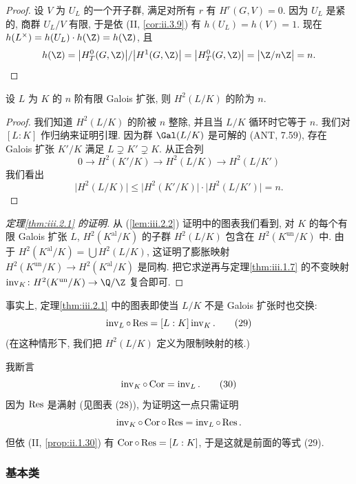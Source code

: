 \begin{proof}
设 $V$ 为 $U_L$ 的一个开子群, 满足对所有 $r$ 有 $H^r(G,V)=0$. 因为 $U_L$ 是紧的, 商群 $U_L/V$ 有限, 于是依 (II, \ref{cor:ii.3.9}) 有 $h(U_L)=h(V)=1$. 现在 $h(L^\times)=h(U_L)\cdot h(\Z)=h(\Z)$, 且
\[
 h(\Z)=\bigl|H_T^0(G,\Z)\bigr|/\bigl|H^1(G,\Z)\bigr|=\bigl|H_T^0(G,\Z)\bigr|=\bigl|\Z/n\Z\bigr|=n.
\]
\end{proof}

\begin{lemma}\label{lem:iii.2.6}
设 $L$ 为 $K$ 的 $n$ 阶有限 Galois 扩张, 则 $H^2(L/K)$ 的阶为 $n$.
\end{lemma}

\begin{proof}
我们知道 $H^2(L/K)$ 的阶被 $n$ 整除, 并且当 $L/K$ 循环时它等于 $n$. 我们对 $[L:K]$ 作归纳来证明引理. 因为群 $\Gal(L/K)$ 是可解的 (ANT, 7.59), 存在 Galois 扩张 $K'/K$ 满足 $L\supsetneq K'\supsetneq K$. 从正合列
\[
 0\to H^2(K'/K)\to H^2(L/K)\to H^2(L/K')
\]
我们看出
\[
 \bigl|H^2(L/K)\bigr|\le\bigl|H^2(K'/K)\bigr|\cdot\bigl|H^2(L/K')\bigr|=n.
\]
\end{proof}

\begin{proof}[定理\ref{thm:iii.2.1} 的证明]
从 (\ref{lem:iii.2.2}) 证明中的图表我们看到, 对 $K$ 的每个有限 Galois 扩张 $L$, $H^2(K^{\mathrm{al}}/K)$ 的子群 $H^2(L/K)$ 包含在 $H^2(K^{\mathrm{un}}/K)$ 中. 由于 $H^2(K^{\mathrm{al}}/K)=\bigcup H^2(L/K)$, 这证明了膨胀映射 $H^2(K^{\mathrm{un}}/K)\to H^2(K^{\mathrm{al}}/K)$ 是同构. 把它求逆再与定理\ref{thm:iii.1.7} 的不变映射 $\inv_K\colon H^2(K^{\mathrm{un}}/K)\to\Q/\Z$ 复合即可.
\end{proof}

事实上, 定理\ref{thm:iii.2.1} 中的图表即使当 $L/K$ 不是 Galois 扩张时也交换:
\begin{equation}
 \operatorname{inv}_L\circ\operatorname{Res}=[L:K]\operatorname{inv}_K.\tag{29}
\end{equation}
(在这种情形下, 我们把 $H^2(L/K)$ 定义为限制映射的核.)

我断言
\begin{equation}
 \operatorname{inv}_K\circ\operatorname{Cor}=\operatorname{inv}_L.\tag{30}
\end{equation}
因为 $\operatorname{Res}$ 是满射 (见图表 (28)), 为证明这一点只需证明
\[
 \operatorname{inv}_K\circ\operatorname{Cor}\circ\operatorname{Res}=\operatorname{inv}_L\circ\operatorname{Res}.
\]
但依 (II, \ref{prop:ii.1.30}) 有 $\operatorname{Cor}\circ\operatorname{Res}=[L:K]$, 于是这就是前面的等式 (29).

\subsubsection*{基本类}

